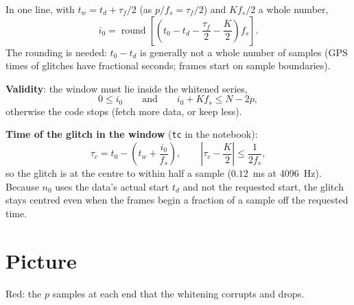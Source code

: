 \documentclass[11pt,a4paper]{article}
\begin{document}
In one line, with $t_w = t_d + \tau_f/2$ (as $p/f_s = \tau_f/2$) and $K f_s/2$ a whole number,
\begin{equation}
  i_0 = \operatorname{round}\!\left[ \left( t_0 - t_d - \frac{\tau_f}{2} - \frac{K}{2} \right) f_s \right].
\end{equation}
The rounding is needed: $t_0 - t_d$ is generally not a whole number of samples (GPS times of glitches have
fractional seconds; frames start on sample boundaries).

\textbf{Validity}: the window must lie inside the whitened series,
\begin{equation}
  0 \le i_0 \qquad\text{and}\qquad i_0 + K f_s \le N - 2p ,
\end{equation}
otherwise the code stops (fetch more data, or keep less).

\textbf{Time of the glitch in the window} (\texttt{tc} in the notebook):
\begin{equation}
  \tau_c = t_0 - \left( t_w + \frac{i_0}{f_s} \right),
  \qquad \left| \tau_c - \frac{K}{2} \right| \le \frac{1}{2 f_s} ,
\end{equation}
so the glitch is at the centre to within half a sample ($0.12$~ms at 4096~Hz). Because $n_0$ uses the data's
actual start $t_d$ and not the requested start, the glitch stays centred even when the frames begin a fraction
of a sample off the requested time.

\section*{Picture}

\begin{center}

\smallskip
{\small Red: the $p$ samples at each end that the whitening corrupts and drops.}
\end{center}
\end{document}
